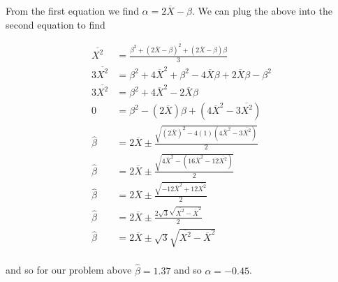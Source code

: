 \begin{VT1}
From the first equation we find $\alpha = 2\overline{X} - \beta$. 
We can plug the above into the second equation to find 

\begin{align}
    \overline{X^{2}} &=  \frac{\beta^{2} + (2\overline{X} - \beta)^{2} + (2\overline{X} - \beta)\beta}{3}\\
    3\overline{X^{2}} &= \beta^{2} + 4 \overline{X}^{2} + \beta^{2} - 4\overline{X} \beta + 2\overline{X} \beta - \beta^{2}\\
    3\overline{X^{2}} &= \beta^{2} + 4 \overline{X}^{2} - 2\overline{X} \beta \\  
    0&= \beta^{2} - (2\overline{X}) \beta + (4 \overline{X}^{2} - 3\overline{X^{2}})\\
    \hat{\beta} &= 2\overline{X} \pm \frac{\sqrt{ (2\overline{X})^{2} - 4(1)(4 \overline{X}^{2} - 3\overline{X^{2}}) } }{2} \\ 
    \hat{\beta} &= 2\overline{X} \pm \frac{\sqrt{ 4\overline{X}^{2} - (16 \overline{X}^{2} - 12\overline{X^{2}}) } }{2} \\
    \hat{\beta} &= 2\overline{X} \pm \frac{\sqrt{ - 12 \overline{X}^{2} + 12\overline{X^{2}} } }{2} \\
    \hat{\beta} &= 2\overline{X} \pm \frac{ 2\sqrt{3} \sqrt{    \overline{X^{2}} -\overline{X}^{2} } }{2} \\
    \hat{\beta} &= 2\overline{X} \pm \sqrt{3} \sqrt{    \overline{X^{2}} -\overline{X}^{2} } \\
\end{align}

and so for our problem above $\hat{\beta} = 1.37$ and so $\alpha = -0.45$.


\end{VT1}


